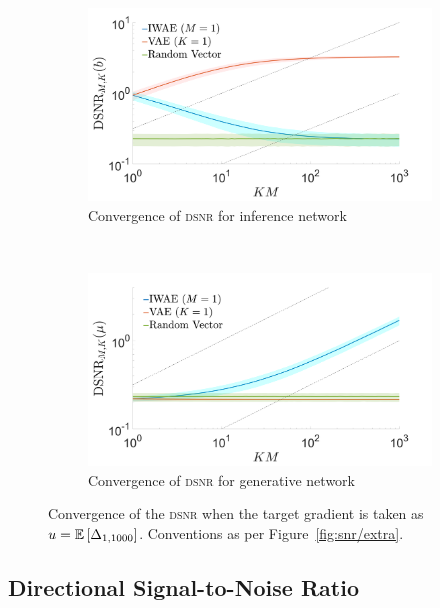 \begin{figure}[t]
	\centering
	\begin{subfigure}[b]{0.4\textwidth}
		\centering
		\includegraphics[width=\textwidth]{figures/tighter_bounds/dir_snr_end}
		\caption{Convergence of \textsc{dsnr} for inference network\label{fig:snr/snr_dir_end}}
	\end{subfigure} ~~~~~~~~~~~~~~
	\begin{subfigure}[b]{0.4\textwidth}
		\centering
		\includegraphics[width=\textwidth]{figures/tighter_bounds/dir_snr_mu_end}
		\caption{Convergence of \textsc{dsnr} for generative network\label{fig:snr/snr_dir_mu_end}}
	\end{subfigure}\vspace{-6pt}
	\caption{Convergence of the \textsc{dsnr} when the
		target gradient is taken as $u = \mathbb{E} \left[\Delta_{1,1000}\right]$.  Conventions as
		per Figure~\ref{fig:snr/extra}.
		\vspace{-14pt}
		\label{fig:snr/extra_end}}
\end{figure}

\subsection{Directional Signal-to-Noise Ratio}

